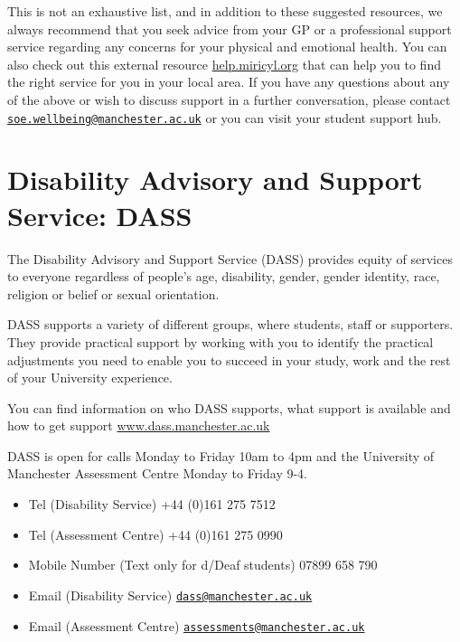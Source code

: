 \documentclass[
]{book}
\providecommand{\tightlist}{%
  \setlength{\itemsep}{0pt}\setlength{\parskip}{0pt}}
\begin{document}
This is not an exhaustive list, and in addition to these suggested resources, we always recommend that you seek advice from your GP or a professional support service regarding any concerns for your physical and emotional health. You can also check out this external resource \href{https://help.miricyl.org}{help.miricyl.org} that can help you to find the right service for you in your local area. If you have any questions about any of the above or wish to discuss support in a further conversation, please
contact \href{mailto:soe.wellbeing@manchester.ac.uk}{\nolinkurl{soe.wellbeing@manchester.ac.uk}} or you can visit your student support hub.

\section{Disability Advisory and Support Service: DASS}\label{dass}

The Disability Advisory and Support Service (DASS) provides equity of services to everyone regardless of people's age, disability, gender, gender identity, race, religion or belief or sexual orientation.

DASS supports a variety of different groups, where students, staff or supporters. They provide practical support by working with you to identify the practical adjustments you need to enable you to succeed in your study, work and the rest of your University experience.

You can find information on who DASS supports, what support is available and how to get support \href{https://www.dass.manchester.ac.uk}{www.dass.manchester.ac.uk} \citep{dass}

DASS is open for calls Monday to Friday 10am to 4pm and the University of Manchester Assessment Centre Monday to Friday 9-4.

\begin{itemize}
\tightlist
\item
  Tel (Disability Service) +44 (0)161 275 7512
\item
  Tel (Assessment Centre) +44 (0)161 275 0990
\item
  Mobile Number (Text only for d/Deaf students) 07899 658 790
\item
  Email (Disability Service) \href{mailto:dass@manchester.ac.uk}{\nolinkurl{dass@manchester.ac.uk}}
\item
  Email (Assessment Centre) \href{mailto:assessments@manchester.ac.uk}{\nolinkurl{assessments@manchester.ac.uk}}
\end{itemize}

  
\end{document}

